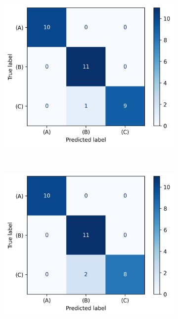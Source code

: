 \documentclass[energies,article,submit,pdftex,moreauthors]{Definitions/mdpi}
\begin{document}
\begin{figure}[t!]
    \centering
    \begin{subfigure}[t]{0.3\textwidth}
        \centering
        \includegraphics[width=\linewidth]{images/confusion_matrix_multiclass}
        \caption{}
    \end{subfigure}%
    ~ 
    \begin{subfigure}[t]{0.3\textwidth}
        \centering
        \includegraphics[width=\linewidth]{images/confusion_matrix_multiclass_1}
        \caption{}
    \end{subfigure}

\end{figure}
\end{document}

